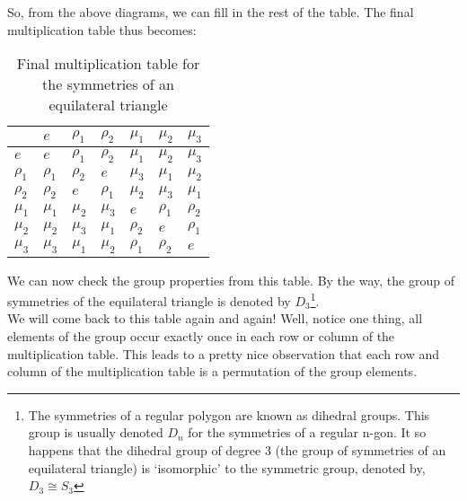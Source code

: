 \begin{figure}[H]
    \centering
    
\end{figure}
\begin{figure}[H]
    \centering
    
\end{figure}
\begin{figure}[H]
    \centering
    
\end{figure}
\noindent
So, from the above diagrams, we can fill in the rest of the table. The final multiplication table thus becomes:
\begin{table}[H]
\centering
\renewcommand{\arraystretch}{1.6} %
\begin{tabular}{|
    >{\centering\arraybackslash}p{}|
    >{\centering\arraybackslash}p{}|
    >{\centering\arraybackslash}p{}|
    >{\centering\arraybackslash}p{}|
    >{\centering\arraybackslash}p{}|
    >{\centering\arraybackslash}p{}|
    >{\centering\arraybackslash}p{}|
    }
\hline
\text{\Large $*$} & $e$ & $\rho_1$ & $\rho_2$ & $\mu_1$ & $\mu_2$ & $\mu_3$ \\
\hline
$e $   &  $e$ & $\rho_1$ & $\rho_2$ & $\mu_1$ & $\mu_2$ & $\mu_3$   \\
\hline
$\rho_1$ & $\rho_1$   &  $\rho_2$  &  $e$ &  $\mu_3$ & $\mu_1$  & $\mu_2$  \\
\hline
$\rho_2$ &  $\rho_2$  & $e$  &   $\rho_1$ & $\mu_2$  &  $\mu_3$ & $\mu_1$  \\
\hline
$\mu_1$  & $\mu_1$   &   $\mu_2$ &  $\mu_3$  &$e$   &  $\rho_1$ &   $\rho_2$\\
\hline
$\mu_2$  & $\mu_2$  &   $\mu_3$ &  $\mu_1$  & $\rho_2$  & $e$  &  $\rho_1$ \\
\hline
$\mu_3$  &  $\mu_3$ &  $\mu_1$  &  $\mu_2$  &  $\rho_1$ & $\rho_2$  &  $e$ \\
\hline
\end{tabular}
\caption{Final multiplication table for the symmetries of an equilateral triangle}
\end{table}
\noindent
We can now check the group properties from this table. By the way, the group of symmetries of the equilateral triangle is denoted by $D_3$\footnote{The symmetries of a regular polygon are known as dihedral groups. This group is usually denoted $D_n$ for the symmetries of a regular n-gon. It so happens that the dihedral group of degree 3 (the group of symmetries of an equilateral triangle) is `isomorphic' to the symmetric group, denoted by, $D_3 \cong S_3$}.\\[0.3cm]We will come back to this table again and again! Well, notice one thing, all elements of the group occur exactly once in each row or column of the multiplication table. This leads to a pretty nice observation that each row and column of the multiplication table is a permutation of the group elements. 
